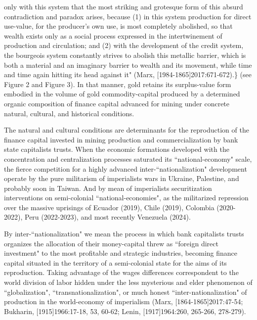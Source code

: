 \documentclass[
]{article}
\begin{document}
only with this system that the most striking and grotesque form of this
absurd contradiction and paradox arises, because (1) in this system
production for direct use-value, for the producer's own use, is most
completely abolished, so that wealth exists only as a social process
expressed in the intertwinement of production and circulation; and (2)
with the development of the credit system, the bourgeois system
constantly strives to abolish this metallic barrier, which is both a
material and an imaginary barrier to wealth and its movement, while time
and time again hitting its head against it" (Marx,
{[}1984-1865{]}2017:671-672).\} (see Figure 2 and Figure 3). In that
manner, gold retains its surplus-value form embodied in the volume of
gold commodity-capital produced by a determined organic composition of
finance capital advanced for mining under concrete natural, cultural,
and historical conditions.

The natural and cultural conditions are determinants for the
reproduction of the finance capital invested in mining production and
commercialization by bank state capitalists trusts. When the economic
formations developed with the concentration and centralization processes
saturated its ``national-economy" scale, the fierce competition for a
highly advanced inter-``nationalization" development operate by the pure
militarism of imperialists wars in Ukraine, Palestine, and probably soon
in Taiwan. And by mean of imperialists securitization interventions on
semi-colonial ``national-economies", as the militarized repression over
the massive uprisings of Ecuador (2019), Chile (2019), Colombia
(2020-2022), Peru (2022-2023), and most recently Venezuela (2024).

By inter-``nationalization" we mean the process in which bank
capitalists trusts organizes the allocation of their money-capital threw
as ``foreign direct investment" to the most profitable and strategic
industries, becoming finance capital situated in the territory of a
semi-colonial state for the aims of its reproduction. Taking advantage
of the wages differences correspondent to the world division of labor
hidden under the less mysterious and elder phenomenon of
``globalization", ``transnationalization", or much honest
``inter-nationalization" of production in the world-economy of
imperialism (Marx, {[}1864-1865{]}2017:47-54; Bukharin,
{[}1915{]}1966:17-18, 53, 60-62; Lenin, {[}1917{]}1964:260, 265-266,
278-279).
\end{document}
